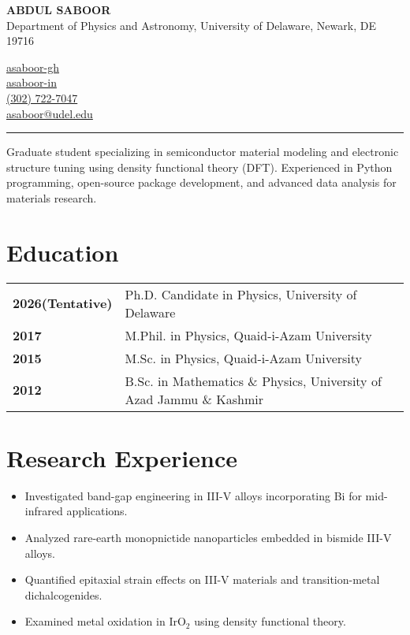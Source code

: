 \documentclass[letter,11pt]{article}
\begin{document}
\begin{minipage}{0.5\textwidth}
    \raggedright
    {\Large \textbf{ABDUL SABOOR}} \\ Department of Physics and Astronomy, University of Delaware, Newark, DE 19716 
\end{minipage}
\hfill
\begin{minipage}{0.3\textwidth}
    \raggedright
    \faGithub \quad \href{https://github.com/asaboor-gh}{asaboor-gh}\\
    \faLinkedin \quad \href{https://linkedin.com/in/asaboor-in}{asaboor-in} \\
    \faPhone \quad \href{tel:+13027227047}{(302) 722-7047} \\
    \faEnvelope \quad \href{mailto:asaboor@udel.edu}{asaboor@udel.edu}
\end{minipage}
\vspace{2mm}
\hrule
\vspace{5mm} \noindent Graduate student specializing in semiconductor material modeling and electronic structure tuning using density functional theory (DFT). Experienced in Python programming, open-source package development, and advanced data analysis for materials research.

\section{Education}
\begin{tabular}{p{3cm} p{12cm}}
    \textbf{2026(Tentative)} & Ph.D. Candidate in Physics, University of Delaware \\
    \textbf{2017} & M.Phil. in Physics, Quaid-i-Azam University \\
    \textbf{2015} & M.Sc. in Physics, Quaid-i-Azam University \\
    \textbf{2012} & B.Sc. in Mathematics \& Physics, University of Azad Jammu \& Kashmir \\
\end{tabular}

\section{Research Experience}

\begin{itemize}
\item Investigated band-gap engineering in III-V alloys incorporating Bi for mid-infrared applications.
\item Analyzed rare-earth monopnictide nanoparticles embedded in bismide III-V alloys.

\item Quantified epitaxial strain effects on III-V materials and transition-metal dichalcogenides.
\item Examined metal oxidation in IrO$_2$ using density functional theory.
\end{itemize}
\end{document}
